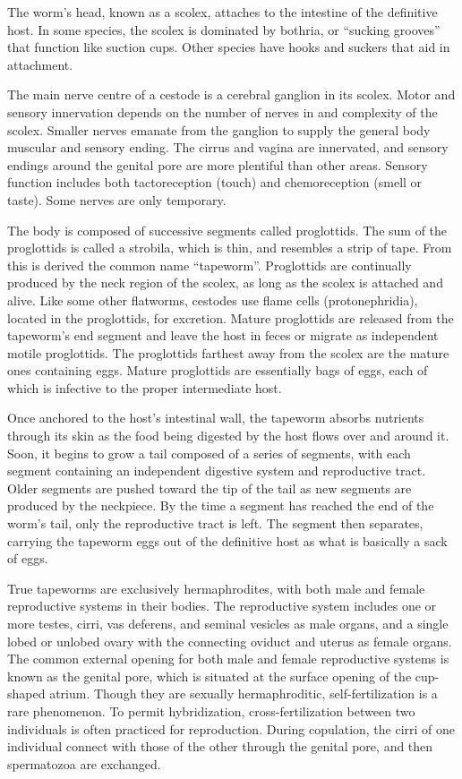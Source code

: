 \documentclass[]{book}
\begin{document}
The worm's head, known as a scolex, attaches to the intestine of the definitive host. In some species, the scolex is dominated by bothria, or ``sucking grooves'' that function like suction cups. Other species have hooks and suckers that aid in attachment.

The main nerve centre of a cestode is a cerebral ganglion in its scolex. Motor and sensory innervation depends on the number of nerves in and complexity of the scolex. Smaller nerves emanate from the ganglion to supply the general body muscular and sensory ending. The cirrus and vagina are innervated, and sensory endings around the genital pore are more plentiful than other areas. Sensory function includes both tactoreception (touch) and chemoreception (smell or taste). Some nerves are only temporary.

The body is composed of successive segments called proglottids. The sum of the proglottids is called a strobila, which is thin, and resembles a strip of tape. From this is derived the common name ``tapeworm''. Proglottids are continually produced by the neck region of the scolex, as long as the scolex is attached and alive. Like some other flatworms, cestodes use flame cells (protonephridia), located in the proglottids, for excretion. Mature proglottids are released from the tapeworm's end segment and leave the host in feces or migrate as independent motile proglottids. The proglottids farthest away from the scolex are the mature ones containing eggs. Mature proglottids are essentially bags of eggs, each of which is infective to the proper intermediate host.

Once anchored to the host's intestinal wall, the tapeworm absorbs nutrients through its skin as the food being digested by the host flows over and around it. Soon, it begins to grow a tail composed of a series of segments, with each segment containing an independent digestive system and reproductive tract. Older segments are pushed toward the tip of the tail as new segments are produced by the neckpiece. By the time a segment has reached the end of the worm's tail, only the reproductive tract is left. The segment then separates, carrying the tapeworm eggs out of the definitive host as what is basically a sack of eggs.

True tapeworms are exclusively hermaphrodites, with both male and female reproductive systems in their bodies. The reproductive system includes one or more testes, cirri, vas deferens, and seminal vesicles as male organs, and a single lobed or unlobed ovary with the connecting oviduct and uterus as female organs. The common external opening for both male and female reproductive systems is known as the genital pore, which is situated at the surface opening of the cup-shaped atrium. Though they are sexually hermaphroditic, self-fertilization is a rare phenomenon. To permit hybridization, cross-fertilization between two individuals is often practiced for reproduction. During copulation, the cirri of one individual connect with those of the other through the genital pore, and then spermatozoa are exchanged.
\end{document}
